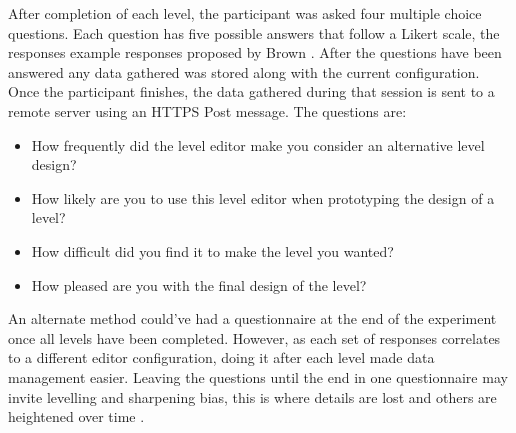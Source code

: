 \documentclass[journal]{IEEEtran}
\begin{document}
 After completion of each level, the participant was asked four multiple choice questions. Each question has five possible answers that follow a Likert scale, the responses example responses proposed by Brown \cite{brown2010likert}. After the questions have been answered any data gathered was stored along with the current configuration. Once the participant finishes, the data gathered during that session is sent to a remote server using an HTTPS Post message.
 The questions are:
\begin{itemize}
    \item How frequently did the level editor make you consider an alternative level design?
    
    \item How likely are you to use this level editor when prototyping the design of a level?

   \item How difficult did you find it to make the level you wanted?

    \item How pleased are you with the final design of the level?
\end{itemize}
An alternate method could've had a questionnaire at the end of the experiment once all levels have been completed. However, as each set of responses correlates to a different editor configuration, doing it after each level made data management easier. Leaving the questions until the end in one questionnaire may invite levelling and sharpening bias, this is where details are lost and others are heightened over time \cite{koriat2000toward}.  

\begin{table}[h]
	\centering
	\caption{Editor Settings}
	\label{settings}
	\def\arraystretch{2}
\end{table}
\end{document}
